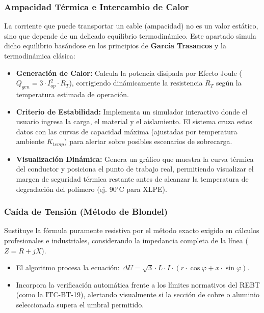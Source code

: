 \documentclass[11pt,a4paper]{article}
\begin{document}
\subsubsection{Ampacidad Térmica e Intercambio de Calor}
La corriente que puede transportar un cable (ampacidad) no es un valor estático, sino que depende de un delicado equilibrio termodinámico. Este apartado simula dicho equilibrio basándose en los principios de \textbf{García Trasancos} y la termodinámica clásica:
\begin{itemize}
    \item \textbf{Generación de Calor:} Calcula la potencia disipada por Efecto Joule ($Q_{gen} = 3 \cdot I_{op}^2 \cdot R_T$), corrigiendo dinámicamente la resistencia $R_T$ según la temperatura estimada de operación.
    \item \textbf{Criterio de Estabilidad:} Implementa un simulador interactivo donde el usuario ingresa la carga, el material y el aislamiento. El sistema cruza estos datos con las curvas de capacidad máxima (ajustadas por temperatura ambiente $K_{temp}$) para alertar sobre posibles escenarios de sobrecarga.
    \item \textbf{Visualización Dinámica:} Genera un gráfico que muestra la curva térmica del conductor y posiciona el punto de trabajo real, permitiendo visualizar el margen de seguridad térmica restante antes de alcanzar la temperatura de degradación del polímero (ej. 90$^\circ$C para XLPE).
\end{itemize}

\subsubsection{Caída de Tensión (Método de Blondel)}
Sustituye la fórmula puramente resistiva por el método exacto exigido en cálculos profesionales e industriales, considerando la impedancia completa de la línea ($Z = R + jX$).
\begin{itemize}
    \item El algoritmo procesa la ecuación: $\Delta U = \sqrt{3} \cdot L \cdot I \cdot (r \cdot \cos \varphi + x \cdot \sin \varphi)$.
    \item Incorpora la verificación automática frente a los límites normativos del REBT (como la ITC-BT-19), alertando visualmente si la sección de cobre o aluminio seleccionada supera el umbral permitido.
\end{itemize}
\end{document}
